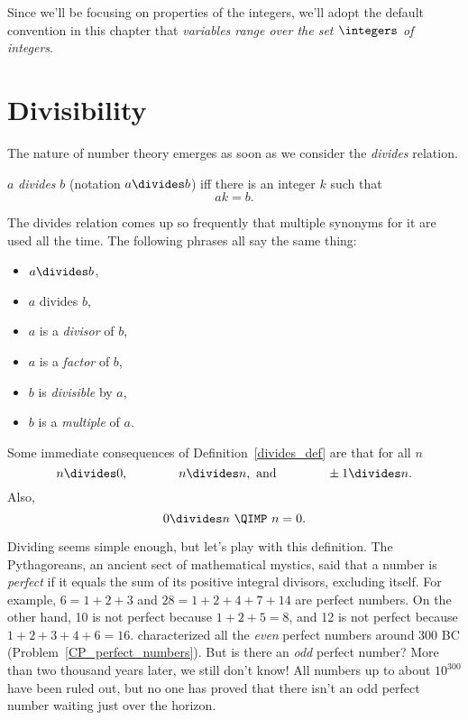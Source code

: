 
Since we'll be focusing on properties of the integers, we'll adopt the
default convention in this chapter that \emph{variables range over
  the set $\integers$ of integers}.

\section{Divisibility}\label{divisibility_sec}

The nature of number theory emerges as soon as we consider the \emph{divides}%
relation.
\begin{definition}\label{divides_def}
$a$ \emph{divides} $b$ (notation $a \divides b$) iff there is an integer $k$ such that
\[
ak = b.
\]
\end{definition}
The divides relation comes up so frequently that multiple synonyms for
it are used all the time.  The following phrases all say the same
thing:
\begin{itemize}
\item $a \divides b$,
\item $a$ divides $b$,
\item $a$ is a \emph{divisor} of $b$,
\item $a$ is a \emph{factor} of $b$,
\item $b$ is \emph{divisible} by $a$,
\item $b$ is a \emph{multiple} of $a$.
\end{itemize}
Some immediate consequences of Definition~\ref{divides_def} are that for
all $n$
\[
n  \divides 0,\qquad\qquad
n  \divides n, \text{ and}\qquad\qquad
\pm1  \divides n.
\]
Also,
\[
0 \divides n\ \QIMP\ n = 0.
\]

Dividing seems simple enough, but let's play with this definition.  The Pythagoreans, an
ancient sect of mathematical mystics, said that a number is \emph{perfect}%
if it equals the sum of its positive 
integral divisors, excluding itself.  For example, $6 = 1 + 2 + 3$ 
and $28 = 1 + 2 + 4 + 7 + 14$ are perfect numbers.
On the other hand, 10 is not perfect because 
$1 + 2 + 5 = 8$, and 12 is not perfect because
$1 + 2 + 3 + 4 + 6 = 16$.   characterized all the 
\emph{even} perfect numbers
around 300 BC (Problem~\ref{CP_perfect_numbers}).  But is there an \emph{odd} perfect
number?  More than two thousand years later, we still don't know!  
All numbers up to about
$10^{300}$ have been ruled out, but no one has proved that there isn't an odd perfect
number waiting just over the horizon.

